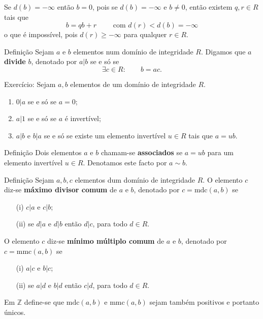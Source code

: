 \documentclass[handout]{beamer}
\newcommand{\ZZ}{\mathbb Z}
\newcommand{\mdc}[2]{\mathrm{mdc}({#1}, {#2})}
\newcommand{\mmc}[2]{\mathrm{mmc}({#1}, {#2})}
\begin{document}
\begin{frame}
Se $d(b)=-\infty$ então $b=0$, pois se $d(b)=-\infty$ e $b\neq 0$, então existem $q,r \in R$ tais que 
$$ b=qb+r \qquad \mbox{ com } d(r) < d(b)=-\infty$$
o que é impossível, pois $d(r)\geq -\infty$ para qualquer $r\in R$.
\end{frame}

\begin{frame}
\begin{block}{Definição}
Sejam $a$ e $b$ elementos num domínio de integridade $R$. Digamos que $a$ {\bf divide} $b$, denotado por $a|b$ se e só se 
$$ \exists c\in R: \qquad b=ac.$$
\end{block}
\pause

Exercício: Sejam $a,b$ elementos de um domínio de integridade $R$.
\begin{enumerate}
\item $0|a$ se e só se $a=0$;\pause
\item $a|1$ se e só se $a$ é invertível;\pause
\item $a|b$ e $b|a$ se e só se existe um elemento invertível $u\in R$ tais que $a=ub$.\pause
\end{enumerate}

\begin{block}{Definição}
Dois elementos $a$ e $b$ chamam-se {\bf associados} se $a=ub$ para um elemento invertível $u\in R$. Denotamos este facto por $a\sim b$.
\end{block}
\end{frame}


\begin{frame}
\begin{block}{Definição}
Sejam $a,b,c$ elementos dum domínio de integridade $R$. O elemento $c$ diz-se {\bf máximo divisor comum} de $a$ e $b$, denotado por $c=\mdc{a}{b}$ se 
\begin{enumerate}
\item[(i)] $c|a$ e $c|b$;
\item[(ii)] se $d|a$ e $d|b$ então $d|c$, para todo $d\in R$.
\end{enumerate}

\pause O elemento $c$ diz-se {\bf mínimo múltiplo comum} de $a$ e $b$, denotado por $c=\mmc{a}{b}$ se 
\begin{enumerate}
\item[(i)] $a|c$ e $b|c$;
\item[(ii)] se $a|d$ e $b|d$ então $c|d$, para todo $d\in R$.
\end{enumerate}\pause
Em $\ZZ$ define-se que $\mdc{a}{b}$ e $\mmc{a}{b}$ sejam também positivos e portanto únicos.

\end{block}

\end{frame}
\end{document}
